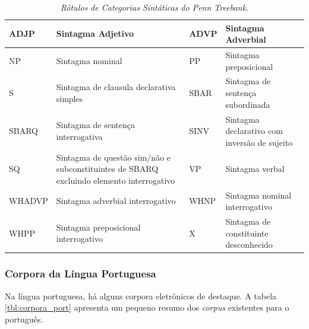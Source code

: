 \begin{table}
   \centering
   \small
   \caption{\it Rótulos de Categorias Sintáticas do Penn Treebank.}

   \begin{tabular}{ | p{2cm} | p{4cm} | p{2cm} | p{4cm} |}

   \hline
		ADJP & Sintagma Adjetivo 	& 	ADVP & Sintagma Adverbial\\
   \hline
		NP & Sintagma nominal 	& 	PP & Sintagma preposicional\\
   \hline
		S & Sintagma de clausula declarativa simples 	& 	SBAR & Sintagma de sentença subordinada\\
   \hline
		SBARQ & Sintagma de sentença interrogativa 	& 	SINV & Sintagma declarativo com inversão de sujeito\\
   \hline
		SQ & Sintagma de questão sim/não e subconstituintes de SBARQ excluindo elemento interrogativo 	& 	 VP & Sintagma verbal\\
   \hline
		WHADVP & Sintagma adverbial interrogativo 	& 	WHNP & Sintagma nominal interrogativo\\
   \hline
		WHPP & Sintagma preposicional interrogativo &    	X & Sintagma de constituinte desconhecido \\
	\hline

   \end{tabular}
   \label{tbl:penn_treebank_cats}
\end{table}

\subsubsection{Corpora da Língua Portuguesa}
\label{sub:corpus_portugues}

Na língua portuguesa, há alguns corpora eletrônicos de destaque. A tabela \ref{tbl:corpora_port} apresenta um pequeno resumo dos \emph{corpus} existentes para o português.

